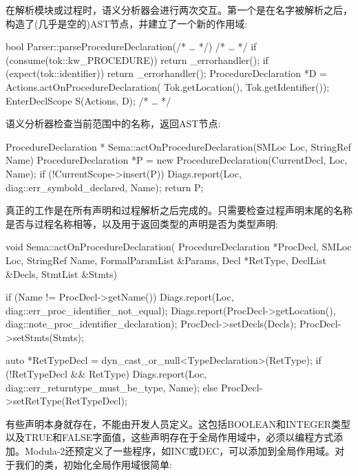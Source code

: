 在解析模块或过程时，语义分析器会进行两次交互。第一个是在名字被解析之后，构造了(几乎是空的)AST节点，并建立了一个新的作用域:

\begin{cpp}
bool Parser::parseProcedureDeclaration(/* … */) {
    /* … */
    if (consume(tok::kw_PROCEDURE)) return _errorhandler();
    if (expect(tok::identifier)) return _errorhandler();
    ProcedureDeclaration *D =
        Actions.actOnProcedureDeclaration(
            Tok.getLocation(), Tok.getIdentifier());
    EnterDeclScope S(Actions, D);
    /* … */
}
\end{cpp}

语义分析器检查当前范围中的名称，返回AST节点:

\begin{cpp}
ProcedureDeclaration *
Sema::actOnProcedureDeclaration(SMLoc Loc, StringRef Name) {
    ProcedureDeclaration *P =
    new ProcedureDeclaration(CurrentDecl, Loc, Name);
    if (!CurrentScope->insert(P))
        Diags.report(Loc, diag::err_symbold_declared, Name);
    return P;
}
\end{cpp}

真正的工作是在所有声明和过程解析之后完成的。只需要检查过程声明末尾的名称是否与过程名称相等，以及用于返回类型的声明是否为类型声明:

\begin{cpp}
void Sema::actOnProcedureDeclaration(
        ProcedureDeclaration *ProcDecl, SMLoc Loc,
        StringRef Name, FormalParamList &Params, Decl *RetType,
        DeclList &Decls, StmtList &Stmts) {

    if (Name != ProcDecl->getName()) {
        Diags.report(Loc, diag::err_proc_identifier_not_equal);
        Diags.report(ProcDecl->getLocation(),
                     diag::note_proc_identifier_declaration);
    }
    ProcDecl->setDecls(Decls);
    ProcDecl->setStmts(Stmts);

    auto *RetTypeDecl =
    dyn_cast_or_null<TypeDeclaration>(RetType);
    if (!RetTypeDecl && RetType)
        Diags.report(Loc, diag::err_returntype_must_be_type, Name);
    else
        ProcDecl->setRetType(RetTypeDecl);
}
\end{cpp}

有些声明本身就存在，不能由开发人员定义。这包括BOOLEAN和INTEGER类型以及TRUE和FALSE字面值，这些声明存在于全局作用域中，必须以编程方式添加。Modula-2还预定义了一些程序，如INC或DEC，可以添加到全局作用域。对于我们的类，初始化全局作用域很简单:

